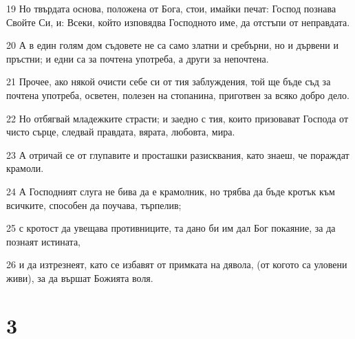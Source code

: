 \par 19 Но твърдата основа, положена от Бога, стои, имайки печат: Господ познава Свойте Си, и: Всеки, който изповядва Господното име, да отстъпи от неправдата.
\par 20 А в един голям дом съдовете не са само златни и сребърни, но и дървени и пръстни; и едни са за почтена употреба, а други за непочтена.
\par 21 Прочее, ако някой очисти себе си от тия заблуждения, той ще бъде съд за почтена употреба, осветен, полезен на стопанина, приготвен за всяко добро дело.
\par 22 Но отбягвай младежките страсти; и заедно с тия, които призовават Господа от чисто сърце, следвай правдата, вярата, любовта, мира.
\par 23 А отричай се от глупавите и просташки разисквания, като знаеш, че пораждат крамоли.
\par 24 А Господният слуга не бива да е крамолник, но трябва да бъде кротък към всичките, способен да поучава, търпелив;
\par 25 с кротост да увещава противниците, та дано би им дал Бог покаяние, за да познаят истината,
\par 26 и да изтрезнеят, като се избавят от примката на дявола, (от когото са уловени живи), за да вършат Божията воля.

\chapter{3}

